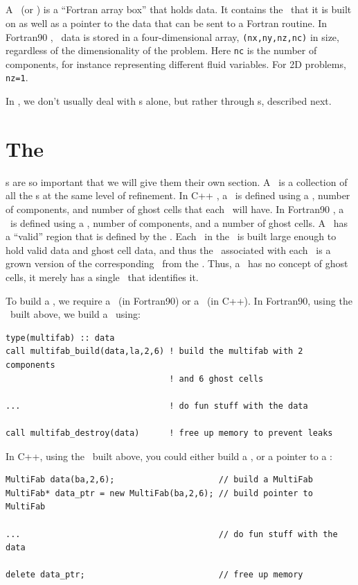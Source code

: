 \subsection{\FArrayBox}

A \FArrayBox\ (or \Fab) is a ``Fortran array box'' that holds data.  It contains the
\BoxType\ that it is built on as well as a pointer to the data 
that can be sent to a Fortran routine.
In Fortran90 \BoxLib, \Fab\ data is stored in a four-dimensional array,
{\tt (nx,ny,nz,nc)} in size, regardless of the dimensionality of the
problem.  Here {\tt nc} is the number of components, for instance
representing different fluid variables.  For 2D problems, {\tt nz=1}.

In \BoxLib, we don't usually deal with 
\Fab s alone, but rather through \MultiFab s, described next.

\section{The \MultiFab}
\MultiFab s are so important that we will give them their own section.
A \MultiFab\ is a collection of all the \Fab s at the same level of
refinement.  In C++ \BoxLib, a \MultiFab\ is defined using a \BoxArray,
number of components, and number of ghost cells that each \Fab\
will have.  In Fortran90 \BoxLib, a \MultiFab\ is defined using a \layout,
number of components, and a number of ghost cells.
A \MultiFab\ has a ``valid'' region that is defined by 
the \BoxArray.  Each \Fab\ in the \MultiFab\ is built large enough 
to hold valid data and ghost cell data, and thus the \BoxType\ associated with
each \Fab\ is a grown version of the corresponding \BoxType\ from the \BoxArray.
Thus, a \Fab\ has no concept 
of ghost cells, it merely has a single \BoxType\ that identifies it.

To build a \MultiFab, we require a \layout\ (in Fortran90) or a \BoxArray\ (in C++).
In Fortran90, using the \layout\ built above, we build a \MultiFab\ using:
\begin{lstlisting}[language={[gnu]make},mathescape=false]
type(multifab) :: data
call multifab_build(data,la,2,6) ! build the multifab with 2 components 
                                 ! and 6 ghost cells

...                              ! do fun stuff with the data

call multifab_destroy(data)      ! free up memory to prevent leaks
\end{lstlisting}
In C++, using the \BoxArray\ built above, you could either build a \MultiFab, 
or a pointer to a \MultiFab:
\begin{lstlisting}[language={[gnu]make},mathescape=false]
MultiFab data(ba,2,6);                     // build a MultiFab
MultiFab* data_ptr = new MultiFab(ba,2,6); // build pointer to MultiFab

...                                        // do fun stuff with the data

delete data_ptr;                           // free up memory
\end{lstlisting}

